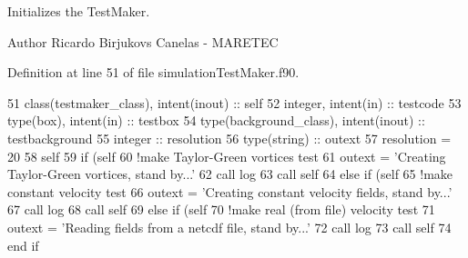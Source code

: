 Initializes the Test\+Maker. 

\begin{DoxyAuthor}{Author}
Ricardo Birjukovs Canelas -\/ M\+A\+R\+E\+T\+EC 
\end{DoxyAuthor}


Definition at line 51 of file simulation\+Test\+Maker.\+f90.


\begin{DoxyCode}
51     \textcolor{keywordtype}{class}(testmaker\_class), \textcolor{keywordtype}{intent(inout)} :: self
52     \textcolor{keywordtype}{integer}, \textcolor{keywordtype}{intent(in)} :: testcode
53     \textcolor{keywordtype}{type}(box), \textcolor{keywordtype}{intent(in)} :: testbox
54     \textcolor{keywordtype}{type}(background\_class), \textcolor{keywordtype}{intent(inout)} :: testbackground
55     \textcolor{keywordtype}{integer} :: resolution
56     \textcolor{keywordtype}{type}(string) :: outext
57     resolution = 20
58     self%
59     \textcolor{keywordflow}{if} (self%
60         \textcolor{comment}{!make Taylor-Green vortices test}
61         outext = \textcolor{stringliteral}{'Creating Taylor-Green vortices, stand by...'}
62         \textcolor{keyword}{call }log%
63         \textcolor{keyword}{call }self%
64     \textcolor{keywordflow}{else} \textcolor{keywordflow}{if} (self%
65         \textcolor{comment}{!make constant velocity test}
66         outext = \textcolor{stringliteral}{'Creating constant velocity fields, stand by...'}
67         \textcolor{keyword}{call }log%
68         \textcolor{keyword}{call }self%
69     \textcolor{keywordflow}{else} \textcolor{keywordflow}{if}  (self%
70         \textcolor{comment}{!make real (from file) velocity test}
71         outext = \textcolor{stringliteral}{'Reading fields from a netcdf file, stand by...'}
72         \textcolor{keyword}{call }log%
73         \textcolor{keyword}{call }self%
74 \textcolor{keywordflow}{    end if}
\end{DoxyCode}
\mbox{\label{namespacesimulationtestmaker__mod_a59ecca693ee5dfe472e2694c9399f0f0}} 
